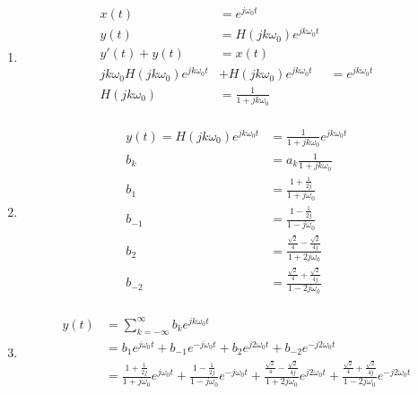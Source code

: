 \documentclass[10pt,a4paper, margin=1in]{article}
\begin{document}
\begin{enumerate}
\begin{enumerate}
     \\

    \item %
    \begin{align*}
        x(t) & = e^{j\omega_0t} \\
        y(t) & = H(jk\omega_0)e^{jk\omega_0t} \\
        y'(t) + y(t) & = x(t) \\
        jk\omega_0H(jk\omega_0)e^{jk\omega_0t} & + H(jk\omega_0)e^{jk\omega_0t} & = e^{jk\omega_0t} \\
        H(jk\omega_0) & = \frac{1}{1 + jk\omega_0} \\
    \end{align*}
	\item %
    \begin{align*}
        y(t) = H(jk\omega_0)e^{jk\omega_0t} & = \frac{1}{1 + jk\omega_0}e^{jk\omega_0t} \\
        b_k & = a_k\frac{1}{1 + jk\omega_0} \\ 
        b_1 & = \frac{1 + \frac{1}{2j}}{1 + j\omega_0} \\
        b_{-1} & = \frac{1 - \frac{1}{2j}}{1 - j\omega_0} \\
        b_2 & = \frac{\frac{\sqrt{2}}{4} - \frac{\sqrt{2}}{4j}}{1 + 2j\omega_0} \\
        b_{-2} & = \frac{\frac{\sqrt{2}}{4} + \frac{\sqrt{2}}{4j}}{1 - 2j\omega_0} \\
    \end{align*}
    \item %
    \begin{align*}
        y(t) & = \sum_{k=-\infty}^{\infty} b_k e^{jk\omega_0t} \\
        & = b_1 e^{j\omega_0t} + b_{-1} e^{-j\omega_0t} + b_2 e^{j2\omega_0t} + b_{-2} e^{-j2\omega_0t} \\
        & = \frac{1 + \frac{1}{2j}}{1 + j\omega_0} e^{j\omega_0t} + \frac{1 - \frac{1}{2j}}{1 - j\omega_0} e^{-j\omega_0t} + \frac{\frac{\sqrt{2}}{4} - \frac{\sqrt{2}}{4j}}{1 + 2j\omega_0} e^{j2\omega_0t} + \frac{\frac{\sqrt{2}}{4} + \frac{\sqrt{2}}{4j}}{1 - 2j\omega_0} e^{-j2\omega_0t} \\
    \end{align*}
    \end{enumerate}


\end{enumerate}
\end{document}
